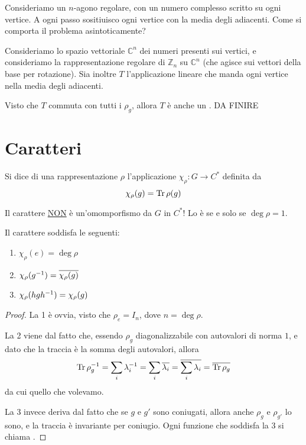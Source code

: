 \documentclass[a4paper,10pt,oneside]{math_article}
\newcommand{\Cyc}{\mathbb Z}
\newcommand{\id}{I}
\let\conj\overline
\begin{document}
  \begin{myex}
   Consideriamo un $n$-agono regolare, con un numero complesso scritto su ogni vertice. A ogni passo sositiuisco ogni vertice con la media degli adiacenti. Come si comporta il problema asintoticamente?
   
   Consideriamo lo spazio vettoriale $\mathbb C^n$ dei numeri presenti sui vertici, e consideriamo la rappresentazione regolare di $\Cyc_n$ su $\mathbb C^n$ (che agisce sui vettori della base per rotazione). Sia inoltre $T$ l'applicazione lineare che manda ogni vertice nella media degli adiacenti.
   
   Visto che $T$ commuta con tutti i $\rho_g$, allora $T$ è anche un . DA FINIRE
  \end{myex}

  
  \section{Caratteri}
    
    \begin{mydef}
     Si dice  di una rappresentazione $\rho$ l'applicazione $\chi_\rho: G \rightarrow C^*$ definita da 
     \[
      \chi_\rho(g)=\operatorname{Tr} \rho(g)
     \]
    \end{mydef}
    
    \begin{Achtung}
      Il carattere \underline{NON} è un'omomporfismo da $G$ in $C^*$! Lo è se e solo se $\deg \rho = 1$. 
    \end{Achtung}

    \begin{myprop}
      Il carattere soddisfa le seguenti:
      \begin{enumerate}
       \item $\chi_\rho(e)=\deg\rho$
       \item $\chi_\rho(g\inv)=\conj{\chi_\rho(g)}$
       \item $\chi_\rho(hgh^{-1})=\chi_\rho(g)$
      \end{enumerate}

    \end{myprop}
    \begin{proof}
     La 1 è ovvia, visto che $\rho_e= \id_n$, dove $n=\deg \rho$.
     
     La 2 viene dal fatto che, essendo $\rho_g$ diagonalizzabile con autovalori di norma $1$, e dato che la traccia è la somma degli autovalori, allora
     \[
      \Tr\rho_g\inv = \sum_i \lambda_i\inv = \sum_i \conj{\lambda_i} = \conj{\sum_i \lambda_i} = \conj{\Tr\rho_g} 
     \]
     da cui quello che volevamo.
     
     La 3 invece deriva dal fatto che se $g$ e $g'$ sono coniugati, allora anche $\rho_g$ e $\rho_{g'}$ lo sono, e la traccia è invariante per coniugio. Ogni funzione che soddisfa la 3 si chiama .
    \end{proof}
    
\end{document}
